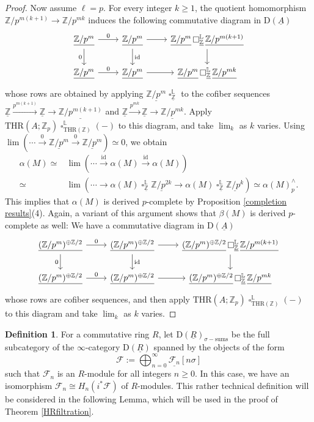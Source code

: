 \documentclass[10pt]{amsart}
\theoremstyle{definition}
\newtheorem{df}[thm]{Definition}
\numberwithin{equation}{section}
\renewcommand{\L}{\mathbb{L}}
\newcommand{\Z}{\mathbb{Z}}
\newcommand{\cF}{\mathcal{F}}
\newcommand{\rD}{\mathrm{D}}
\newcommand{\ul}{\underline}
\newcommand{\id}{\mathrm{id}}
\DeclareMathOperator{\sotimes}{\square}
\newcommand{\THR}{\mathrm{THR}}
\begin{document}
\begin{proof}
Now assume $\ell=p$.
For every integer $k\geq 1$,
the quotient homomorphism $\Z/p^{m(k+1)}\to \Z/p^{mk}$ induces the following commutative diagram in $\rD(\ul{A})$
\[
\begin{tikzcd}
\ul{\Z/p^m} \ar[d,"0"']\ar[r,"0"]&
\ul{\Z/p^m} \ar[d,"\id"]\ar[r]&
\ul{\Z/p^m}\sotimes_{\ul{\Z}}^\L \ul{\Z/p^{m(k+1)}}\ar[d]
\\
\ul{\Z/p^m}\ar[r,"0"]&
\ul{\Z/p^m}\ar[r]&
\ul{\Z/p^m}\sotimes_{\ul{\Z}}^\L \ul{\Z/p^{mk}}
\end{tikzcd}
\]
whose rows are
obtained by applying $\ul{\Z/p^m} \sotimes_{\ul{\Z}}^\L$ to the cofiber sequences $\ul{\Z} \xrightarrow{p^{m(k+1)}} \ul{\Z} \to  \ul{\Z/p^{m(k+1)}}$ and $\ul{\Z}\xrightarrow{p^{mk}} \ul{\Z} \to \ul{\Z/p^{mk}}$.
Apply $\THR(A;\Z_p)\sotimes_{\THR(\Z)}^\L(-)$ to this diagram,
and take $\lim_k$ as $k$ varies.
Using $\lim(\cdots \xrightarrow{0}\ul{\Z/p^m}\xrightarrow{0} \ul{\Z/p^m})\simeq 0$,
we obtain
\begin{align*}
\alpha(M)
\simeq  &
\lim(\cdots \xrightarrow{\id} \alpha(M)\xrightarrow{\id}  \alpha(M))
\\
\simeq &
\lim(\cdots \to \alpha(M)\sotimes_{\ul{\Z}}^\L \ul{\Z/p^{2k}}
\to
\alpha(M)\sotimes_{\ul{\Z}}^\L \ul{\Z/p^{k}})
\simeq 
\alpha(M)_p^\wedge.
\end{align*}
This implies that $\alpha(M)$ is derived $p$-complete by Proposition \ref{completion results}(4).
Again, a variant of this argument shows that $\beta(M)$ is derived $p$-complete as well:
We have a commutative diagram in $\rD(\ul{A})$
\[
\begin{tikzcd}
\ul{(\Z/p^m)^{\oplus \Z/2}} \ar[d,"0"']\ar[r,"0"]&
\ul{(\Z/p^m)^{\oplus \Z/2}} \ar[d,"\id"]\ar[r]&
\ul{(\Z/p^m)^{\oplus \Z/2}}\sotimes_{\ul{\Z}}^\L \ul{\Z/p^{m(k+1)}}\ar[d]
\\
\ul{(\Z/p^m)^{\oplus \Z/2}}\ar[r,"0"]&
\ul{(\Z/p^m)^{\oplus \Z/2}}\ar[r]&
\ul{(\Z/p^m)^{\oplus \Z/2}}\sotimes_{\ul{\Z}}^\L \ul{\Z/p^{mk}}
\end{tikzcd}
\]
whose rows are cofiber sequences, and then apply $\THR(A;\Z_p)\sotimes_{\THR(\Z)}^\L(-)$ to this diagram and take $\lim_k$ as $k$ varies.
\end{proof}



\begin{df}
For a commutative ring $R$,
let $\rD(\ul{R})_{\sigma-\mathrm{sums}}$ be the full subcategory of the $\infty$-category $\rD(\ul{R})$
spanned by the objects of the form
\[
\cF:=
\bigoplus_{n=0}^\infty \ul{\cF_n}[n\sigma]
\]
such that $\cF_n$ is an $R$-module for all integers $n\geq 0$.
In this case,
we have an isomorphism $\cF_n\cong H_n(i^*\cF)$ of $R$-modules. 
This rather technical definition will be considered in the following Lemma, which will be used in the proof of 
Theorem \ref{HRfiltration}.
\end{df}
\end{document}
